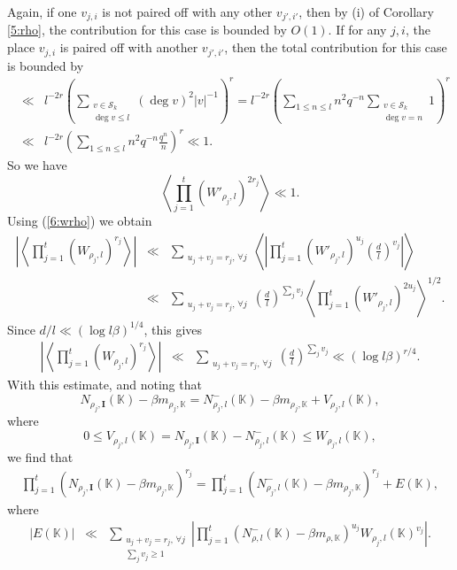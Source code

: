 \documentclass[12pt]{amsart}
\theoremstyle{plain}
\begin{document}
Again, if one $v_{j,i}$ is not paired off with any other $v_{j',i'}$, then by (i) of Corollary \ref{5:rho}, the contribution for this case is bounded by $O(1)$. If for any $j,i$, the place $v_{j,i}$ is paired off with another $v_{j',i'}$, then the total contribution for this case is bounded by
\begin{eqnarray*} & \ll & l^{-2r} \left(\sum_{\substack{v \in {\mathcal{S}_k}\\
\deg v \le l}}(\deg v)^2 |v|^{-1}\right)^r = l^{-2r} \left(\sum_{1 \le n \le l}n^2 q^{-n}\sum_{\substack{v \in {\mathcal{S}_k}\\
\deg v=n}}1 \right)^r \\
& \ll & l^{-2r} \left(\sum_{1 \le n \le l}n^2 q^{-n} \frac{q^n}{n} \right)^r \ll 1. \end{eqnarray*}
So we have
\[\left\langle \prod_{j=1}^t(W'_{\rho_j,l})^{2r_j} \right\rangle \ll 1.\]
Using (\ref{6:wrho}) we obtain
\begin{eqnarray*} \left|\left\langle \prod_{j=1}^t(W_{\rho_j,l})^{r_j} \right\rangle \right|&\ll & \sum_{\substack{u_j+v_j=r_j , \, \forall j}} \left\langle \left|\prod_{j=1}^t(W'_{\rho_j,l})^{u_j} \left(\frac{d}{l}\right)^{v_j}\right| \right\rangle \\
& \ll & \sum_{\substack{u_j+v_j=r_j , \, \forall j}} \left(\frac{d}{l}\right)^{\sum_j v_j} \left\langle \prod_{j=1}^t(W'_{\rho_j,l})^{2u_j} \right\rangle^{1/2}.
\end{eqnarray*}
Since $d/l \ll (\log l \beta)^{1/4}$, this gives
\begin{eqnarray} \label{6:wrho2} \left|\left\langle \prod_{j=1}^t(W_{\rho_j,l})^{r_j} \right\rangle \right|
& \ll & \sum_{\substack{u_j+v_j=r_j , \, \forall j}} \left(\frac{d}{l}\right)^{\sum_j v_j} \ll (\log l \beta)^{r/4}.
\end{eqnarray}
With this estimate, and noting that
\[N_{\rho_j,{{\mathbf I}}}({{\mathbb K}})- \beta m_{\rho_j,{{\mathbb K}}} =N_{\rho_j,l}^{-}({{\mathbb K}})-\beta m_{\rho_j,{{\mathbb K}}}+V_{\rho_j,l}({{\mathbb K}}),\]
where
\[0 \le V_{\rho_j,l}({{\mathbb K}}) = N_{\rho_j,{{\mathbf I}}}({{\mathbb K}})-N_{\rho_j,l}^{-}({{\mathbb K}}) \le W_{\rho_j,l}({{\mathbb K}}), \]
we find that
\begin{eqnarray*} \label{6:pn} \prod_{j=1}^t\left(N_{\rho_j,{{\mathbf I}}}({{\mathbb K}})- \beta m_{\rho_j,{{\mathbb K}}}\right)^{r_j} =
\prod_{j=1}^t \left(N_{\rho_j,l}^-({{\mathbb K}})- \beta m_{\rho_j,{{\mathbb K}}}\right)^{r_j} +E({{\mathbb K}}),\end{eqnarray*}
where
\begin{eqnarray*} |E({{\mathbb K}})| &\ll & \sum_{\substack{u_j+v_j=r_j, \, \forall j \\
\sum_j v_j \ge 1}} \left|\prod_{j=1}^t \left(N_{\rho,l}^-({{\mathbb K}})- \beta m_{\rho,{{\mathbb K}}}\right)^{u_j}  W_{\rho_j,l}({{\mathbb K}})^{v_j}\right|. \end{eqnarray*}
\end{document}
